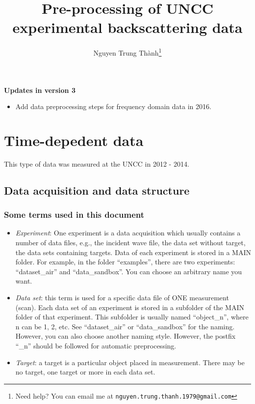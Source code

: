\documentclass[a4paper,12pt]{article}
\title{Pre-processing of UNCC experimental backscattering data}
\author{Nguyen Trung Th\`anh\footnote{Need help? You can email me at \texttt{nguyen.trung.thanh.1979@gmail.com}}}
\begin{document}
\maketitle

\noindent\textbf{Updates in version 3}

\begin{itemize}
 \item Add data preprocessing steps for frequency domain data in 2016. 

\end{itemize}

\section{Time-depedent data}
This type of data was measured at the UNCC in 2012 - 2014. 

\subsection{Data acquisition and data structure}

\subsubsection{Some terms used in this document}
\begin{itemize}
\item \textit{Experiment}: One experiment is a data acquisition which usually contains a number of data files, e.g., the incident wave file, the data set without target, the data sets containing targets. Data of each experiment is stored in a MAIN folder. For example, in the folder ``examples'', there are two experiments: ``dataset\_air'' and ``data\_sandbox''. You can choose an arbitrary name you want.  

\item \textit{Data set}: this term is used for a specific data file of ONE measurement (scan).  
Each data set of an experiment is stored in a subfolder of the MAIN folder of that experiment. 
This subfolder is usually named ``object\_n'', where n can be 1, 2, etc. See ``dataset\_air'' or ``data\_sandbox'' for the naming. However, you can also choose another naming style. However, the postfix ``\_n'' should be followed for automatic preprocessing. 

\item \textit{Target}: a target is a particular object placed in measurement. There may be no target, one target or more in each data set.
\end{itemize}
\end{document}

